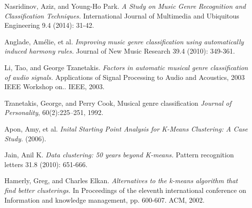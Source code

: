 \begin{thebibliography}{9}
                Nasridinov, Aziz, and Young-Ho Park. 
                \emph{A Study on Music Genre Recognition and Classification Techniques.} 
                International Journal of Multimedia and Ubiquitous Engineering 9.4 (2014): 31-42.

                Anglade, Amélie, et al. 
                \emph{Improving music genre classification using automatically induced harmony rules.} 
                Journal of New Music Research 39.4 (2010): 349-361.

                Li, Tao, and George Tzanetakis. 
                \emph{Factors in automatic musical genre classification of audio signals.} 
                Applications of Signal Processing to Audio and Acoustics, 2003 IEEE Workshop on.. IEEE, 2003.

                Tzanetakis, George, and Perry Cook, Musical genre classification 
                \emph{Journal of Personality},
                60(2):225–251,
                1992.


                Apon, Amy, et al. 
                \emph{Inital Starting Point Analysis for K-Means Clustering: A Case Study.} 
                (2006).

                Jain, Anil K. 
                \emph{Data clustering: 50 years beyond K-means.} 
                Pattern recognition letters 31.8 (2010): 651-666.

                Hamerly, Greg, and Charles Elkan. 
                \emph{Alternatives to the k-means algorithm that find better clusterings.} 
                In Proceedings of the eleventh international conference on Information and knowledge management, pp. 600-607.
                ACM, 2002.

\end{thebibliography}
